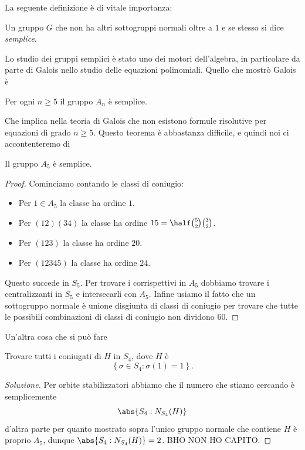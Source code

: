\documentclass[11pt]{scrartcl}
\begin{document}
	La seguente definizione è di vitale importanza:
	\begin{definition}
		Un gruppo $G$ che non ha altri sottogruppi normali oltre a $1$ e se stesso si dice \textit{semplice}.
	\end{definition}
	Lo studio dei gruppi semplici è stato uno dei motori dell'algebra, in particolare da parte di Galois nello studio delle equazioni polinomiali. Quello che mostrò Galois è
	\begin{theorem*}
		Per ogni $n\ge 5$ il gruppo $A_n$ è semplice. 
	\end{theorem*}
	Che implica nella teoria di Galois che non esistono formule risolutive per equazioni di grado $n\ge 5$. Questo teorema è abbastanza difficile, e quindi noi ci accontenteremo di 
	\begin{theorem}
		Il gruppo $A_5$ è semplice.
	\end{theorem}
	\begin{proof}
		Cominciamo contando le classi di coniugio:
		\begin{itemize}
			\item Per $1\in A_5$ la classe ha ordine $1$.
			\item Per $(12)(34)$ la classe ha ordine $15=\half\binom{5}{2}\binom{3}{2}$.
			\item Per $(123)$ la classe ha ordine $20$. 
			\item Per $(12345)$ la classe ha ordine $24$.
		\end{itemize}
		Questo succede in $S_5$. Per trovare i corrispettivi in $A_5$ dobbiamo trovare i centralizzanti in $S_5$ e intersecarli con $A_5$. Infine usiamo il fatto che un sottogruppo normale è unione disgiunta di classi di coniugio per trovare che tutte le possibili combinazioni di classi di coniugio non dividono $60$.
	\end{proof}
	Un'altra cosa che si può fare
	\begin{exercise}
		Trovare tutti i coniugati di $H$ in $S_4$, dove $H$ è 
		$$\left\{\sigma\in S_4:\sigma(1)=1\right\}.$$ 
	\end{exercise}
	\begin{proof}[Soluzione]
		Per orbite stabilizzatori abbiamo che il numero che stiamo cercando è semplicemente
		$$\abs{S_4:N_{S_4}(H)}$$
		d'altra parte per quanto mostrato sopra l'unico gruppo normale che contiene $H$ è proprio $A_5$, dunque $\abs{S_4:N_{S_4}(H)}=2$. BHO NON HO CAPITO.
	\end{proof}
\end{document}
